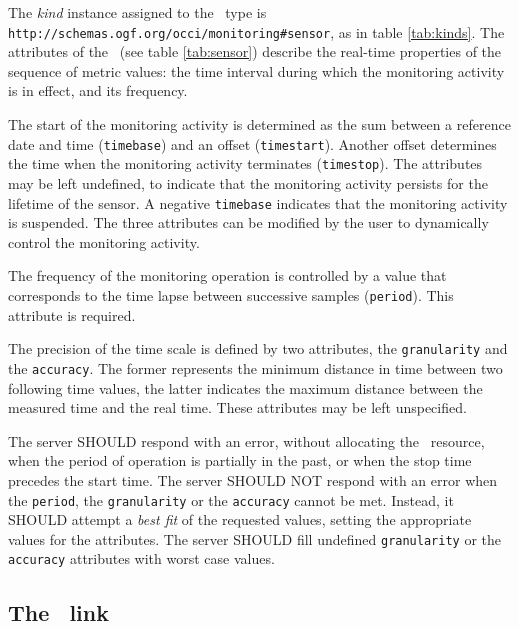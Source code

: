 \documentclass[10pt,a4paper]{article}
\begin{document}
The {\em kind} instance assigned to the \sens\ type is {\tt http://schemas.ogf.org/occi/monitoring\#sensor}, as in table \ref{tab:kinds}. The attributes of the \sens\ (see table \ref{tab:sensor}) describe the real-time properties of the sequence of metric values: the time interval during which the monitoring activity is in effect, and its frequency.

The start of the monitoring activity is determined as the sum between a reference date and time ({\tt timebase}) and an offset ({\tt timestart}). Another offset determines the time when the monitoring activity terminates ({\tt timestop}). The attributes may be left undefined, to indicate that the monitoring activity persists for the lifetime of the sensor. A negative {\tt timebase} indicates that the monitoring activity is suspended. The three attributes can be modified by the user to dynamically control the monitoring activity.

The frequency of the monitoring operation is controlled by a value that corresponds to the time lapse between successive samples ({\tt period}). This attribute is required.

The precision of the time scale is defined by two attributes, the {\tt granularity} and the {\tt accuracy}. The former represents the minimum distance in time between two following time values, the latter indicates the maximum distance between the measured time and the real time. These attributes may be left unspecified.

The server SHOULD respond with an error, without allocating the \sens\ resource, when the period of operation is partially in the past, or when the stop time precedes the start time. The server SHOULD NOT respond with an error when the {\tt period}, the {\tt granularity} or the {\tt accuracy} cannot be met. Instead, it SHOULD attempt a {\em best fit} of the requested values, setting the appropriate values for the attributes. The server SHOULD fill undefined {\tt granularity} or the {\tt accuracy} attributes with worst case values. 

\subsection{The \coll\ link \label{sec:collector}}

\end{document}
